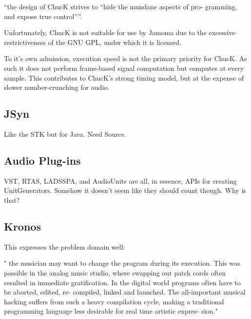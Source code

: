 \documentclass[twoside,10pt]{article}
\begin{document}
``the design of ChucK strives to “hide the mundane aspects of pro- gramming, and expose true control”''\cite{wang:2008}.

Unfortunately, ChucK is not suitable for use by Jamoma due to the excessive restrictiveness of the GNU GPL, under which it is licensed.

To it's own admission, execution speed is not the primary priority for ChucK.  As such it does not perform frame-based signal computation but computes at every sample.  This contributes to ChucK's strong timing model, but at the expense of slower number-crunching for audio.





\subsection{JSyn} %

Like the STK but for Java.  Need Source.


\subsection{Audio Plug-ins} %

VST, RTAS, LADSSPA, and AudioUnits are all, in essence, APIs for creating UnitGenerators.  Somehow it doesn't seem like they should count though.  Why is that?



\subsection{Kronos} %

This expresses the problem domain well:

" the musician may want to change the program during its execution. This was possible in the analog music studio, where swapping out patch cords often resulted in immediate gratification. In the digital world programs often have to be aborted, edited, re- compiled, linked and launched. The all-important musical hacking suffers from such a heavy compilation cycle, making a traditional programming language less desirable for real time artistic expres- sion." \cite{Norilo:2009}
\end{document}
